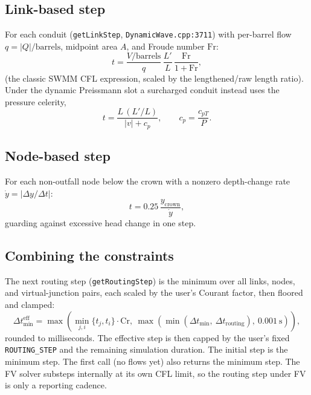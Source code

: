 \documentclass[11pt,a4paper]{article}
\newcommand{\st}{\mathrm{s}}
\begin{document}
\subsection{Link-based step}

For each conduit (\texttt{getLinkStep}, \texttt{DynamicWave.cpp:3711}) with
per-barrel flow $q = \lvert Q \rvert/\mathrm{barrels}$, midpoint area $A$, and
Froude number $\mathrm{Fr}$:
\begin{equation}
  t = \frac{V/\mathrm{barrels}}{q}\,
      \frac{L'}{L}\,\frac{\mathrm{Fr}}{1 + \mathrm{Fr}},
\end{equation}
(the classic SWMM CFL expression, scaled by the lengthened/raw length ratio).
Under the dynamic Preissmann slot a surcharged conduit instead uses the
pressure celerity,
\begin{equation}
  t = \frac{L\,(L'/L)}{\lvert v \rvert + c_p}, \qquad
  c_p = \frac{c_{pT}}{P}.
\end{equation}

\subsection{Node-based step}

For each non-outfall node below the crown with a nonzero depth-change rate
$\dot y = \lvert \Delta y/\Delta t \rvert$:
\begin{equation}
  t = 0.25\,\frac{y_{\mathrm{crown}}}{\dot y},
\end{equation}
guarding against excessive head change in one step.

\subsection{Combining the constraints}

The next routing step (\texttt{getRoutingStep}) is the minimum over all links,
nodes, and virtual-junction pairs, each scaled by the user's Courant factor,
then floored and clamped:
\begin{equation}
  \Delta t_{\min}^{\mathrm{eff}} =
    \max\!\left(\min_{j,i}\{t_j, t_i\}\cdot \mathrm{Cr},\
      \max(\min(\Delta t_{\min},\ \Delta t_{\mathrm{routing}}),\
      0.001\ \st)\right),
\end{equation}
rounded to milliseconds. The effective step is then capped by the user's fixed
\texttt{ROUTING\_STEP} and the remaining simulation duration. The initial step
is the minimum step. The first call (no flows yet) also returns the minimum
step. The FV solver substeps internally at its own CFL limit, so the routing
step under FV is only a reporting cadence.
\end{document}
